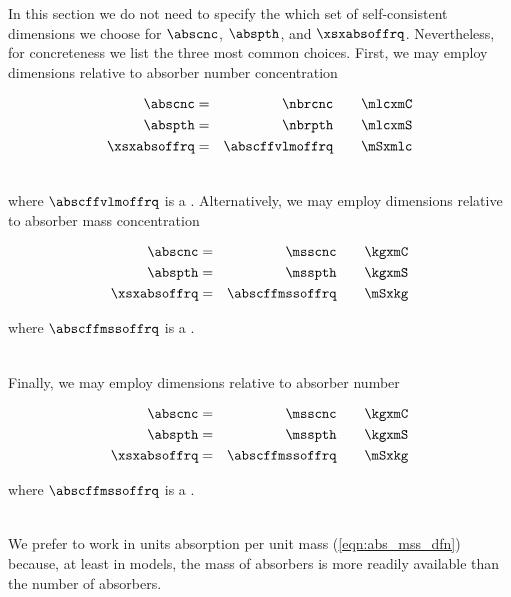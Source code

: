 \documentclass[12pt]{article}
\begin{document}
In this section we do not need to specify the which set of
self-consistent dimensions we choose for $\abscnc$, $\abspth$, and 
$\xsxabsoffrq$. 
Nevertheless, for concreteness we list the three most common choices.
First, we may employ dimensions relative to absorber number
concentration 
\newline\parbox{6in}{\begin{eqnarray} %
\abscnc & = & \nbrcnc \qquad\mbox{\mlcxmC} \nonumber \\
\abspth & = & \nbrpth \qquad\mbox{\mlcxmS} \nonumber \\
\xsxabsoffrq & = & \abscffvlmoffrq \qquad\mbox{\mSxmlc}\nonumber 
\end{eqnarray}}\hfill %
\parbox{1cm}{\begin{eqnarray}\label{eqn:abs_nbr_dfn}\end{eqnarray}}\newline
where $\abscffvlmoffrq$ is a .
Alternatively, we may employ dimensions relative to absorber mass
concentration
\newline\parbox{6in}{\begin{eqnarray} %
\abscnc & = & \msscnc \qquad\mbox{\kgxmC} \nonumber \\
\abspth & = & \msspth \qquad\mbox{\kgxmS} \nonumber \\
\xsxabsoffrq & = & \abscffmssoffrq \qquad\mbox{\mSxkg} \nonumber 
\end{eqnarray}}\hfill %
where $\abscffmssoffrq$ is a .
\parbox{1cm}{\begin{eqnarray}\label{eqn:abs_mss_dfn}\end{eqnarray}}\newline
Finally, we may employ dimensions relative to absorber number
\newline\parbox{6in}{\begin{eqnarray} %
\abscnc & = & \msscnc \qquad\mbox{\kgxmC} \nonumber \\
\abspth & = & \msspth \qquad\mbox{\kgxmS} \nonumber \\
\xsxabsoffrq & = & \abscffmssoffrq \qquad\mbox{\mSxkg} \nonumber 
\end{eqnarray}}\hfill %
where $\abscffmssoffrq$ is a .
\parbox{1cm}{\begin{eqnarray}\label{eqn:abs_mss_dfn}\end{eqnarray}}\newline
We prefer to work in units absorption per unit mass
(\ref{eqn:abs_mss_dfn}) because, at least in models, the mass of
absorbers is more readily available than the number of absorbers.
\end{document}
